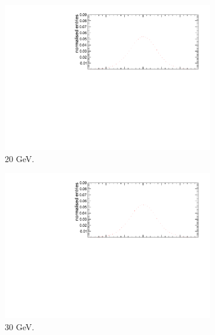 \begin{figure}[htbp!]
\begin{subfigure}[t]{0.5\textwidth}
		\includegraphics[width=1\textwidth]{../Thesis_Plots/Timing/Electrons/Plots/Comparison_SimData_Electrons20GeV.pdf}
		\caption{20 GeV.}\label{fig:elec_sim_data_20GeV}
	\end{subfigure}
	\hfill
	\begin{subfigure}[t]{0.5\textwidth}
		\centering
		\includegraphics[width=1\textwidth]{../Thesis_Plots/Timing/Electrons/Plots/Comparison_SimData_Electrons30GeV.pdf}
		\caption{30 GeV.}\label{fig:elec_sim_data_30GeV}
	\end{subfigure}
	\hfill
	\begin{subfigure}[t]{0.5\textwidth}
		\centering

\end{subfigure}
\end{figure}
